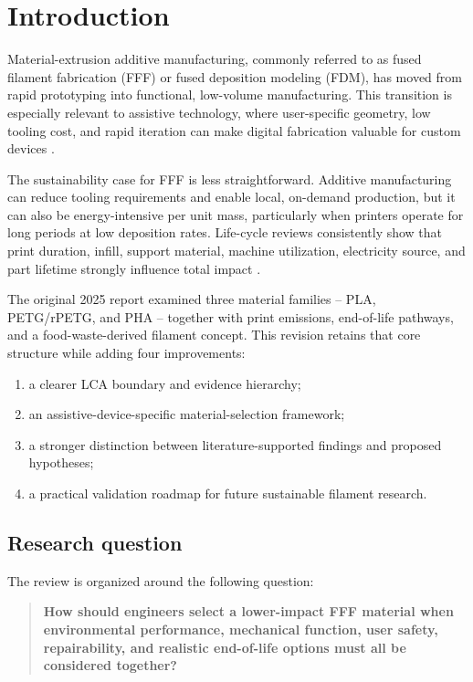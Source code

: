 \documentclass[11pt]{article}
\begin{document}
\newpage
{}

\section{Introduction}

Material-extrusion additive manufacturing, commonly referred to as fused filament fabrication (FFF) or fused deposition modeling (FDM), has moved from rapid prototyping into functional, low-volume manufacturing. This transition is especially relevant to assistive technology, where user-specific geometry, low tooling cost, and rapid iteration can make digital fabrication valuable for custom devices \cite{chen2016,tenkate2017}.

The sustainability case for FFF is less straightforward. Additive manufacturing can reduce tooling requirements and enable local, on-demand production, but it can also be energy-intensive per unit mass, particularly when printers operate for long periods at low deposition rates. Life-cycle reviews consistently show that print duration, infill, support material, machine utilization, electricity source, and part lifetime strongly influence total impact \cite{kreiger2013,sola2024}.

The original 2025 report examined three material families -- PLA, PETG/rPETG, and PHA -- together with print emissions, end-of-life pathways, and a food-waste-derived filament concept. This revision retains that core structure while adding four improvements:

\begin{enumerate}
  \item a clearer LCA boundary and evidence hierarchy;
  \item an assistive-device-specific material-selection framework;
  \item a stronger distinction between literature-supported findings and proposed hypotheses;
  \item a practical validation roadmap for future sustainable filament research.
\end{enumerate}

\subsection{Research question}

The review is organized around the following question:

\begin{quote}
\textbf{How should engineers select a lower-impact FFF material when environmental performance, mechanical function, user safety, repairability, and realistic end-of-life options must all be considered together?}
\end{quote}
\end{document}
